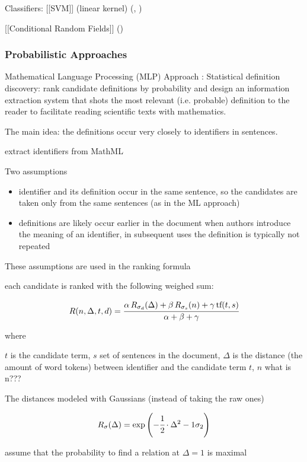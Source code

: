 Classifiers:
[[SVM]] (linear kernel) (\cite{kristianto2014extracting}, \cite{yokoi2011contextual})

[[Conditional Random Fields]] (\cite{kristianto2014extracting})


\subsubsection{Probabilistic Approaches}
Mathematical Language Processing (MLP) Approach \cite{pagael2014mlp}: Statistical definition discovery: rank candidate definitions by probability and design an 
information extraction system that shots the most relevant (i.e. probable) 
definition to the reader to facilitate reading scientific texts with mathematics.


The main idea: the definitions occur very closely to identifiers in sentences.


extract identifiers from MathML


Two assumptions

\begin{itemize}
  \item identifier and its definition occur in the same sentence, so the candidates are 
  taken only from the same sentences (as in the ML approach)
  \item definitions are likely occur earlier in the document when authors introduce 
  the meaning of an identifier, in subsequent uses the definition is typically not repeated
\end{itemize}

These assumptions are used in the ranking formula

each candidate is ranked with the following weighed sum:

$$R(n, \Delta, t, d) = \cfrac{\alpha \, R_{\sigma_d}(\Delta) + \beta \, R_{\sigma_s}(n) + \gamma \, \text{tf}(t, s)}{\alpha + \beta + \gamma}$$

where

$t$ is the candidate term,
$s$ set of sentences in the document,
$\Delta$ is the distance (the amount of word tokens) between identifier and the candidate term $t$,
$n$ what is n??? %

The distances modeled with Gaussians (instead of taking the raw ones)

$$R_{\sigma}(\Delta) = \exp \left( -\cfrac{1}{2} \cdot {\Delta^2 - 1}{\sigma_2} \right)$$

assume that the probability to find a relation at $\Delta = 1$ is maximal

